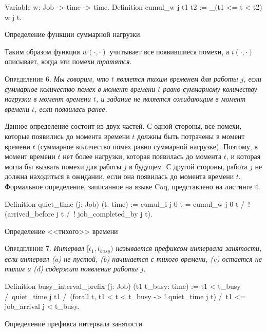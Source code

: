 \begin{listing}
\begin{pyglist}[numbers=none,numbersep=5pt, fontsize=\small]
  Variable w: Job -> time -> time.
  Definition cumul_w j t1 t2 :=
    \sum_(t1 <= t < t2) w j t.
\end{pyglist}
\caption{Определение функции суммарной нагрузки.}
\label{lst:theorem2}
\end{listing}

Таким образом функция $w(\cdot,\cdot)$ учитывает все
  появившиеся помехи, а $i(\cdot,\cdot)$ описывает, когда эти помехи \textit{тратятся}.

\textsc{Определение 6.}
\textit{Мы говорим, что $t$ является тихим временем для работы $j$, если суммарное
  количество помех в момент времени $t$ равно суммарному количеству нагрузки в момент
  времени $t$, и задание не является ожидающим в момент времени $t$, если появилась
  ранее.
}

Данное определение состоит из двух частей. С одной стороны, все помехи, которые появились
  до момента времени $t$ должны быть потрачены в момент времени $t$ (суммарное количество
  помех равно суммарной нагрузке). Поэтому, в момент времени $t$ нет более нагрузки,
  которая появилась до момента $t$, и которая могла бы вызвать помехи для работы $j$
  в будущем. С другой стороны, работа $j$ не должна находиться в ожидании, если она
  появилась до момента времени $t$. Формальное определение, записанное на языке Coq, представлено на листинге 4.
\begin{listing}
\begin{pyglist}[numbers=none,numbersep=5pt, fontsize=\small]
  Definition quiet_time (j: Job) (t: time) :=
    cumul_i j 0 t = cumul_w j 0 t /\
    ! (arrived_before j t /\ ! job_completed_by j t).
\end{pyglist}
\caption{Определение <<тихого>> времени}
\label{lst:theorem2}
\end{listing}

\textsc{Определение 7.}
\textit{Интервал $[t_1, t_{busy})$ называется префиксом интервала занятости,
  если интервал (a) не пустой, (b) начинается с тихого
  времени, (c) остается не тихим и (d) содержит появление работы $j$.
}


\begin{listing}
\begin{pyglist}[numbers=none,numbersep=5pt, fontsize=\small]
  Definition busy_interval_prefix (j: Job)
                                  (t1 t_busy: time) :=
    t1 < t_busy /\
    quiet_time j t1 /\
    (forall t, t1 < t < t_busy -> ! quiet_time j t) /\
    t1 <= job_arrival j < t_busy.
\end{pyglist}
\caption{Определение префикса интервала занятости}
\label{lst:theorem2}
\end{listing}

